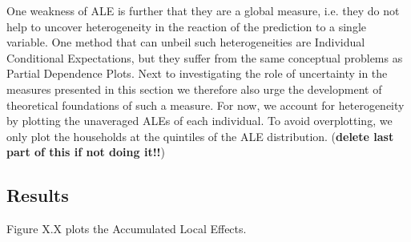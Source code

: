 One weakness of ALE is further that they are a global measure, i.e. they do not help to uncover heterogeneity in the reaction of the prediction to a single variable. One method that can unbeil such heterogeneities are Individual Conditional Expectations, but they suffer from the same conceptual problems as Partial Dependence Plots. Next to investigating the role of uncertainty in the measures presented in this section we therefore also urge the development of theoretical foundations of such a measure. For now, we account for heterogeneity by plotting the unaveraged ALEs of each individual. To avoid overplotting, we only plot the households at the quintiles of the ALE distribution. (\textbf{delete last part of this if not doing it!!})

\subsection{Results}
Figure X.X plots the Accumulated Local Effects.